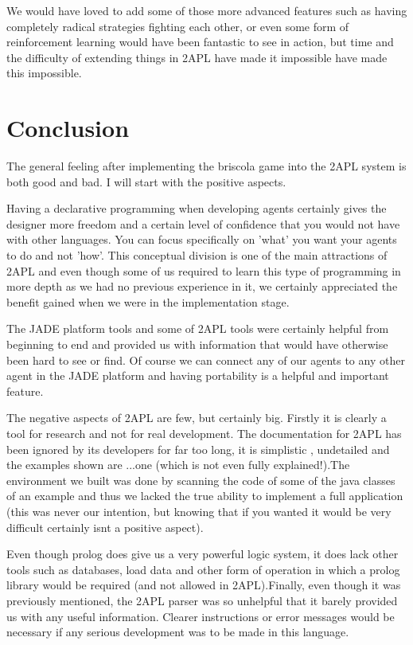 \documentclass[a4paper]{article}
\begin{document}
We would have loved to add some of those more advanced features such as having completely radical strategies fighting each other, or even some form of reinforcement learning would have been fantastic to see in action, but time and the difficulty of extending things in 2APL have made it impossible have made this impossible.


\section{Conclusion}\label{sec:concl} 

The general feeling after implementing the briscola game into the 2APL system is both good and bad. I will start with the positive aspects.

Having a declarative programming when developing agents certainly gives the designer more freedom and a certain level of confidence that you would not have with other languages. You can focus specifically on 'what' you want your agents to do and not 'how'. This conceptual division is one of the main attractions of 2APL and even though some of us required to learn this type of programming in more depth as we had no previous experience in it, we certainly appreciated the benefit gained when we were in the implementation stage.

The JADE platform tools and some of 2APL tools were certainly helpful from beginning to end and provided us with information that would have otherwise been hard to see or find. Of course we can connect any of our agents to any other agent in the JADE platform and having portability is a helpful and important feature.

The negative aspects of 2APL are few, but certainly big. Firstly it is clearly a tool for research and not for real development. The documentation for 2APL has been ignored by its developers for far too long, it is simplistic , undetailed and the examples shown are ...one (which is not even fully explained!).The environment we built was done by scanning the code of some of the java classes of an example and thus we lacked the true ability to implement a full application (this was never our intention, but knowing that if you wanted it would be very difficult certainly isnt a positive aspect).

Even though prolog does give us a very powerful logic system, it does lack other tools such as databases, load data and other form of operation in which a prolog library would be required (and not allowed in 2APL).Finally, even though it was previously mentioned, the 2APL parser was so unhelpful that it barely provided us with any useful information. Clearer instructions or error messages would be necessary if any serious development was to be made in this language.
\end{document}

